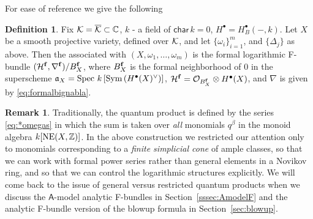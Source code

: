 \documentclass[twoside,leqno]{article}
\numberwithin{equation}{section}
\theoremstyle{plain}
\theoremstyle{definition}
\newtheorem{definition}[equation]{Definition}
\newtheorem{remark}[equation]{Remark}
\begin{document}
For ease of reference we give the following

\begin{definition} \label{def:formalFomegas} Fix 
$\mathcal K  = \overline{\mathcal K} \subset \mathbb C$, $k$ - a field of $\mathsf{char} \, k = 0$, $H^{\bullet} = H^{\bullet}_{B}(-,k)$. Let  $X$ be a smooth projective variety, defined over $\mathcal K$, and let $\{\omega_{i}\}_{i=1}^{m}$, and $\{\Delta_{j}\}$ as above. Then
the  associated
with $(X,\omega_{1},\ldots,\omega_{m})$ is the formal logarithmic F-bundle
$(\mathcal H^{\mathbf{f}},\nabla^{\mathbf{f}})/B_{X}^{\mathbf{f}}$, where $B_{X}^{\mathbf{f}}$ is the formal
neighborhood of $0$ in the superscheme ${\mathfrak{a}}_{X} = \operatorname{Spec} \,
k\left[\operatorname{Sym}\left(H^{\bullet}(X)^{\vee}\right)\right]$,
$\mathcal H^{\mathbf{f}} = \mathcal{O}_{B_{X}^{\mathbf{f}}}\otimes H^{\bullet}(X)$, and $\nabla$
is given by
\eqref{eq:formalbignabla}.
\end{definition}

\begin{remark} \label{rem:ample.choices} Traditionally, the quantum product is defined by the  series \eqref{eq:*omegas}  in which the sum is taken  over \emph{all} monomials  $q^{\beta}$ in the monoid algebra $k[\operatorname{NE}(X,\mathbb Z)]$. In the above construction we restricted our attention only to  monomials corresponding to a \emph{finite simplicial cone} of ample classes, so that we can work with formal power series rather than  general elements in a Novikov ring, and so that we can control the logarithmic structures explicitly. We will come back to the issue of general versus restricted quantum products when we discuss the $\mathsf{A}$-model analytic F-bundles in Section~\ref{sssec:AmodelF}  and the analytic F-bundle version of the blowup formula in Section~\ref{sec:blowup}. 
\end{remark}
\end{document}
